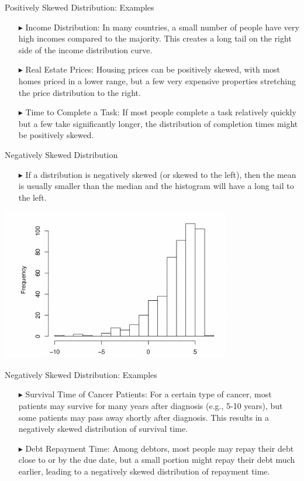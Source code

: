 \documentclass[12pt]{beamer}
\begin{document}
\begin{frame}{Positively Skewed Distribution: Examples}
	\begin{itemize}
		\item[$\blacktriangleright$] Income Distribution: In many countries, a small number of people have very high incomes compared to the majority. This creates a long tail on the right side of the income distribution curve.
		\item[$\blacktriangleright$] Real Estate Prices: Housing prices can be positively skewed, with most homes priced in a lower range, but a few very expensive properties stretching the price distribution to the right.
		\item[$\blacktriangleright$] Time to Complete a Task: If most people complete a task relatively quickly but a few take significantly longer, the distribution of completion times might be positively skewed.
		
	\end{itemize}
\end{frame}
\begin{frame}{Negatively Skewed Distribution}
	\begin{itemize}
		\item[$\blacktriangleright$] If a distribution is negatively skewed (or skewed to the left), then the mean is usually smaller than the median and the histogram will have a long tail to the left.
	\end{itemize}
	\centering
	\includegraphics[width=10cm]{ns.png}
\end{frame}
\begin{frame}{Negatively Skewed Distribution: Examples}
	\begin{itemize}
		\item[$\blacktriangleright$] Survival Time of Cancer Patients: For a certain type of cancer, most patients may survive for many years after diagnosis (e.g., 5-10 years), but some patients may pass away shortly after diagnosis. This results in a negatively skewed distribution of survival time.
		\item[$\blacktriangleright$] Debt Repayment Time: Among debtors, most people may repay their debt close to or by the due date, but a small portion might repay their debt much earlier, leading to a negatively skewed distribution of repayment time.
		
	\end{itemize}
\end{frame}
\end{document}
